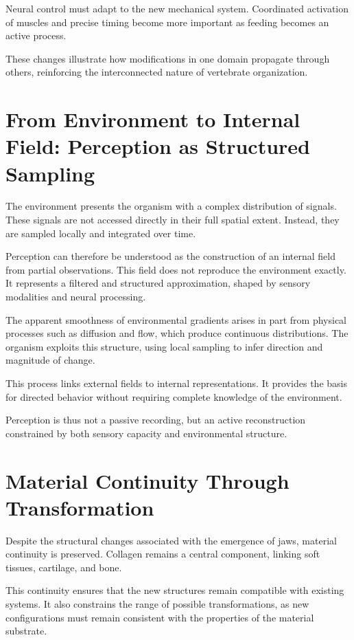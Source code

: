 \documentclass[11pt,oneside]{book}
\begin{document}
Neural control must adapt to the new mechanical system. Coordinated activation of muscles and precise timing become more important as feeding becomes an active process.

These changes illustrate how modifications in one domain propagate through others, reinforcing the interconnected nature of vertebrate organization.

\section{From Environment to Internal Field: Perception as Structured Sampling}

The environment presents the organism with a complex distribution of signals. These signals are not accessed directly in their full spatial extent. Instead, they are sampled locally and integrated over time.

Perception can therefore be understood as the construction of an internal field from partial observations. This field does not reproduce the environment exactly. It represents a filtered and structured approximation, shaped by sensory modalities and neural processing.

The apparent smoothness of environmental gradients arises in part from physical processes such as diffusion and flow, which produce continuous distributions. The organism exploits this structure, using local sampling to infer direction and magnitude of change.

This process links external fields to internal representations. It provides the basis for directed behavior without requiring complete knowledge of the environment.

Perception is thus not a passive recording, but an active reconstruction constrained by both sensory capacity and environmental structure.

\section{Material Continuity Through Transformation}

Despite the structural changes associated with the emergence of jaws, material continuity is preserved. Collagen remains a central component, linking soft tissues, cartilage, and bone.

This continuity ensures that the new structures remain compatible with existing systems. It also constrains the range of possible transformations, as new configurations must remain consistent with the properties of the material substrate.
\end{document}

